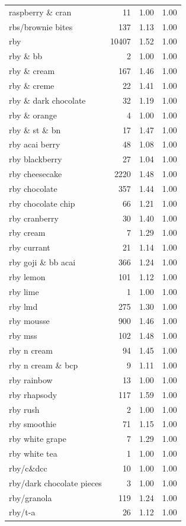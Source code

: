 \begin{table}
\begin{tabular}{lrrr}
raspberry \& cran & 11 & 1.00 & 1.00 \\
rbs/brownie bites & 137 & 1.13 & 1.00 \\
rby & 10407 & 1.52 & 1.00 \\
rby \& bb & 2 & 1.00 & 1.00 \\
rby \& cream & 167 & 1.46 & 1.00 \\
rby \& creme & 22 & 1.41 & 1.00 \\
rby \& dark chocolate & 32 & 1.19 & 1.00 \\
rby \& orange & 4 & 1.00 & 1.00 \\
rby \& st \& bn & 17 & 1.47 & 1.00 \\
rby acai berry & 48 & 1.08 & 1.00 \\
rby blackberry & 27 & 1.04 & 1.00 \\
rby cheesecake & 2220 & 1.48 & 1.00 \\
rby chocolate & 357 & 1.44 & 1.00 \\
rby chocolate chip & 66 & 1.21 & 1.00 \\
rby cranberry & 30 & 1.40 & 1.00 \\
rby cream & 7 & 1.29 & 1.00 \\
rby currant & 21 & 1.14 & 1.00 \\
rby goji \& bb acai & 366 & 1.24 & 1.00 \\
rby lemon & 101 & 1.12 & 1.00 \\
rby lime & 1 & 1.00 & 1.00 \\
rby lmd & 275 & 1.30 & 1.00 \\
rby mousse & 900 & 1.46 & 1.00 \\
rby mss & 102 & 1.48 & 1.00 \\
rby n cream & 94 & 1.45 & 1.00 \\
rby n cream \& bcp & 9 & 1.11 & 1.00 \\
rby rainbow & 13 & 1.00 & 1.00 \\
rby rhapsody & 117 & 1.59 & 1.00 \\
rby rush & 2 & 1.00 & 1.00 \\
rby smoothie & 71 & 1.15 & 1.00 \\
rby white grape & 7 & 1.29 & 1.00 \\
rby white tea & 1 & 1.00 & 1.00 \\
rby/c\&dcc & 10 & 1.00 & 1.00 \\
rby/dark chocolate pieces & 3 & 1.00 & 1.00 \\
rby/granola & 119 & 1.24 & 1.00 \\
rby/t-a & 26 & 1.12 & 1.00 \\

\end{tabular}
\end{table}
